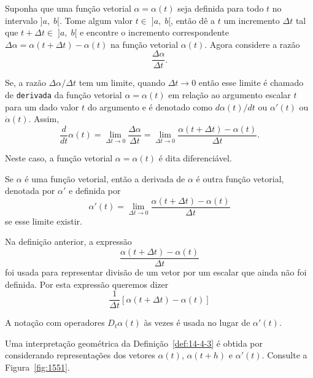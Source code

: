 Suponha que uma função vetorial \(\alpha = \alpha(t)\) seja definida para todo \(t\) no intervalo \(]a,\; b[\). Tome algum valor \(t \in\; ]a,\; b[\), então dê a \(t\) um incremento \(\Delta t\) tal que \(t+\Delta t \in\; ]a,\; b[\) e encontre o incremento correspondente 
\(\Delta \alpha = \alpha(t + \Delta t) - \alpha(t)\) na função vetorial \(\alpha(t)\). Agora considere a razão 
\begin{equation*}
	\dfrac{\Delta \alpha }{\Delta t}.
\end{equation*}

Se, a razão \(\Delta \alpha/\Delta t\) tem um limite, quando  \(\Delta t\to 0\) então esse limite é chamado de \texttt{derivada} da função vetorial \(\alpha = \alpha(t)\) em relação ao argumento escalar \(t\) para um dado valor \(t\) do argumento e é denotado como \(d\alpha(t)/dt\) ou \(\alpha'(t)\) ou \(\dot{\alpha}(t)\). Assim,
\begin{equation*}
\dfrac{d}{dt}\alpha(t) = \lim_{\Delta t \to 0}\dfrac{\Delta \alpha }{\Delta t}=
\lim_{\Delta t \to 0}\dfrac{\alpha(t+\Delta t)-\alpha(t)}{\Delta t}.
\end{equation*}

Neste caso, a função vetorial \(\alpha=\alpha(t)\) é dita diferenciável.


\begin{defi}[Derivada]\label{def:14-4-3}
Se \(\alpha\) é uma função vetorial, então a derivada de \(\alpha\) é outra função  vetorial, denotada por \(\alpha'\) e definida por
\begin{equation*}
  \alpha'(t)= \lim_{\Delta t\to 0}\frac{\alpha(t+\Delta t) -\alpha(t)}{\Delta t}
\end{equation*}
se esse limite existir.
\end{defi}

Na definição anterior, a expressão
\begin{equation*}
\frac{\alpha(t+\Delta t) -\alpha(t)}{\Delta t}
\end{equation*}
foi usada para representar divisão de um vetor por um escalar que ainda não foi definida. Por esta expressão queremos
dizer
\begin{equation*}
  \frac{1}{\Delta t}\left[\alpha(t+\Delta t) -\alpha(t)\right]
\end{equation*}

A notação com operadores \(D_{t}\alpha(t)\) às vezes é usada no lugar de \(\alpha'(t)\).

Uma interpretação geométrica da Definição~\ref{def:14-4-3} é obtida por considerando representações dos vetores
\(\alpha(t)\), \(\alpha(t + h)\) e \( \alpha'(t)\). Consulte a Figura~\ref{fig:1551}.

